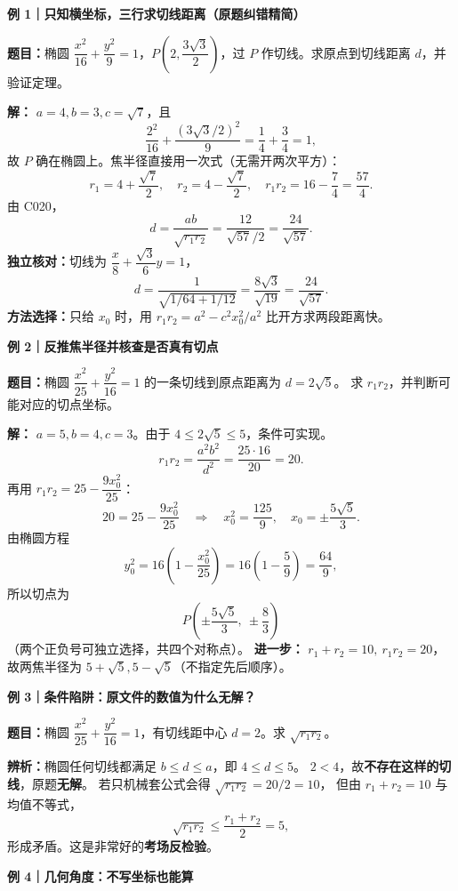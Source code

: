 \begin{examplebox}
\textbf{\textcolor{CExample}{例 1｜只知横坐标，三行求切线距离（原题纠错精简）}}

\textbf{题目：}椭圆 $\dfrac{x^2}{16}+\dfrac{y^2}{9}=1$，$P\left(2,\dfrac{3\sqrt3}{2}\right)$，过 $P$ 作切线。求原点到切线距离 $d$，并验证定理。

\textbf{解：} $a=4,b=3,c=\sqrt7$，且
\[
\frac{2^2}{16}+\frac{(3\sqrt3/2)^2}{9}=\frac14+\frac34=1,
\]
故 $P$ 确在椭圆上。焦半径直接用一次式（无需开两次平方）：
\[
r_1=4+\frac{\sqrt7}{2},\quad
r_2=4-\frac{\sqrt7}{2},\quad
r_1r_2=16-\frac74=\frac{57}{4}.
\]
由 C020，
\[
\boxed{d=\frac{ab}{\sqrt{r_1r_2}}
=\frac{12}{\sqrt{57}/2}
=\frac{24}{\sqrt{57}}}.
\]
\textbf{独立核对：}切线为 $\dfrac{x}{8}+\dfrac{\sqrt3}{6}y=1$，
\[
d=\frac1{\sqrt{1/64+1/12}}
=\frac{8\sqrt3}{\sqrt{19}}=\frac{24}{\sqrt{57}}.
\]
\textbf{方法选择：}只给 $x_0$ 时，用 $r_1r_2=a^2-c^2x_0^2/a^2$ 比开方求两段距离快。

\medskip
\textbf{\textcolor{CExample}{例 2｜反推焦半径并核查是否真有切点}}

\textbf{题目：}椭圆 $\dfrac{x^2}{25}+\dfrac{y^2}{16}=1$ 的一条切线到原点距离为 $d=2\sqrt5$。
求 $r_1r_2$，并判断可能对应的切点坐标。

\textbf{解：} $a=5,b=4,c=3$。由于 $4\le2\sqrt5\le5$，条件可实现。
\[
r_1r_2=\frac{a^2b^2}{d^2}
=\frac{25\cdot16}{20}=\boxed{20}.
\]
再用 $r_1r_2=25-\dfrac{9x_0^2}{25}$：
\[
20=25-\frac{9x_0^2}{25}
\quad\Longrightarrow\quad x_0^2=\frac{125}{9},
\quad x_0=\pm\frac{5\sqrt5}{3}.
\]
由椭圆方程
\[
y_0^2=16\left(1-\frac{x_0^2}{25}\right)
=16\left(1-\frac59\right)=\frac{64}{9},
\]
所以切点为
\[
\boxed{P\left(\pm\frac{5\sqrt5}{3},\ \pm\frac83\right)}
\]
（两个正负号可独立选择，共四个对称点）。
\textbf{进一步：} $r_1+r_2=10,\ r_1r_2=20$，故两焦半径为 $5+\sqrt5,5-\sqrt5$（不指定先后顺序）。

\medskip
\textbf{\textcolor{CExample}{例 3｜条件陷阱：原文件的数值为什么无解？}}

\textbf{题目：}椭圆 $\dfrac{x^2}{25}+\dfrac{y^2}{16}=1$，有切线距中心 $d=2$。求 $\sqrt{r_1r_2}$。

\textbf{辨析：}椭圆任何切线都满足 $b\le d\le a$，即 $4\le d\le5$。
$2<4$，故\textbf{不存在这样的切线}，原题\textbf{无解}。
若只机械套公式会得 $\sqrt{r_1r_2}=20/2=10$，
但由 $r_1+r_2=10$ 与均值不等式，
\[
\sqrt{r_1r_2}\le\frac{r_1+r_2}{2}=5,
\]
形成矛盾。这是非常好的\textbf{考场反检验}。

\medskip
\textbf{\textcolor{CExample}{例 4｜几何角度：不写坐标也能算}}


\end{examplebox}

